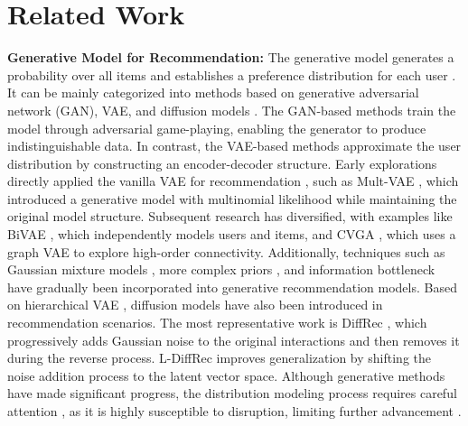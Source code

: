 \documentclass[sigconf]{acmart}
\begin{document}
\section{Related Work}
\textbf{Generative Model for Recommendation:} The generative model generates a probability over all items and establishes a preference distribution for each user \cite{kingma2013auto, liang2018variational}. It can be mainly categorized into methods based on generative adversarial network (GAN), VAE, and diffusion models \cite{liu2021self, huang2025trustworthiness}. The GAN-based methods \cite{yu2019vaegan, wang2017irgan} train the model through adversarial game-playing, enabling the generator to produce indistinguishable data. In contrast, the VAE-based methods \cite{liang2018variational, zhang2023revisiting} approximate the user distribution by constructing an encoder-decoder structure. Early explorations directly applied the vanilla VAE \cite{kingma2013auto} for recommendation \cite{li2017collaborative}, such as Mult-VAE \cite{liang2018variational}, which introduced a generative model with multinomial likelihood while maintaining the original model structure. Subsequent research has diversified, with examples like BiVAE \cite{truong2021bilateral}, which independently models users and items, and CVGA \cite{zhang2023revisiting}, which uses a graph VAE to explore high-order connectivity. Additionally, techniques such as Gaussian mixture models \cite{xu2020learning}, more complex priors \cite{xu2022alleviating, takahashi2019variational}, and information bottleneck \cite{cao2022cross, wang2025federated} have gradually been incorporated into generative recommendation models. Based on hierarchical VAE \cite{sonderby2016ladder}, diffusion models \cite{ho2020denoising, luo2022understanding} have also been introduced in recommendation scenarios. The most representative work is DiffRec \cite{wang2023diffusion}, which progressively adds Gaussian noise to the original interactions and then removes it during the reverse process. L-DiffRec \cite{wang2023diffusion} improves generalization by shifting the noise addition process to the latent vector space. Although generative methods have made significant progress, the distribution modeling process requires careful attention \cite{higgins2017beta, kingma2016improved}, as it is highly susceptible to disruption, limiting further advancement \cite{wang2022posterior, wang2023diffusion}.
\end{document}
